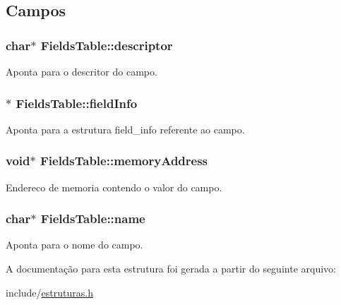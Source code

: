 \subsection{Campos}
\subsubsection[{\texorpdfstring{descriptor}{descriptor}}]{\setlength{\rightskip}{0pt plus 5cm}char$\ast$ Fields\+Table\+::descriptor}\hypertarget{struct_fields_table_aa1cd4a61abe3e42fd3d2ce8e9a692924}{}\label{struct_fields_table_aa1cd4a61abe3e42fd3d2ce8e9a692924}


Aponta para o descritor do campo. 

\subsubsection[{\texorpdfstring{field\+Info}{fieldInfo}}]{$\ast$ Fields\+Table\+::field\+Info}\hypertarget{struct_fields_table_a0d8937ba1f6023433e234337d5825315}{}\label{struct_fields_table_a0d8937ba1f6023433e234337d5825315}


Aponta para a estrutura field\+\_\+info referente ao campo. 

\subsubsection[{\texorpdfstring{memory\+Address}{memoryAddress}}]{\setlength{\rightskip}{0pt plus 5cm}void$\ast$ Fields\+Table\+::memory\+Address}\hypertarget{struct_fields_table_a5c251342633df2e314a6b88c25f2a604}{}\label{struct_fields_table_a5c251342633df2e314a6b88c25f2a604}


Endereco de memoria contendo o valor do campo. 

\subsubsection[{\texorpdfstring{name}{name}}]{\setlength{\rightskip}{0pt plus 5cm}char$\ast$ Fields\+Table\+::name}\hypertarget{struct_fields_table_a931fde572e99face7e9cd2fbc29cd36e}{}\label{struct_fields_table_a931fde572e99face7e9cd2fbc29cd36e}


Aponta para o nome do campo. 



A documentação para esta estrutura foi gerada a partir do seguinte arquivo\+:\begin{DoxyCompactItemize}
\item 
include/\hyperlink{estruturas_8h}{estruturas.\+h}\end{DoxyCompactItemize}
